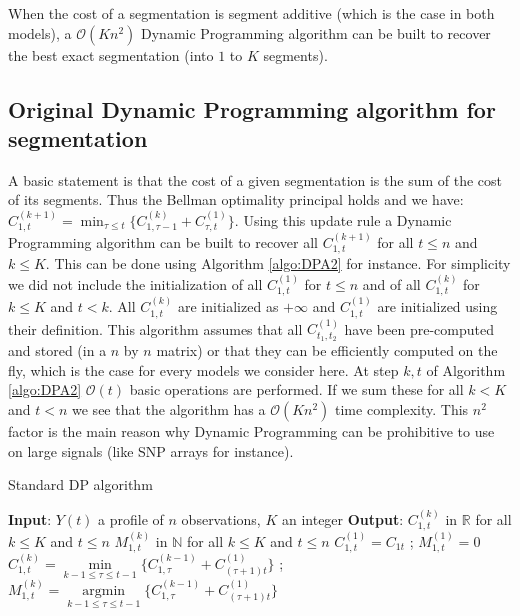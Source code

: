 \documentclass[11pt]{llncs}
\begin{document}
When the cost of a segmentation is segment additive (which is the case in both models), a $\mathcal{O}(Kn^2)$ Dynamic Programming algorithm can be built to recover the best exact segmentation (into $1$ to $K$ segments).

\subsection{Original Dynamic Programming algorithm for segmentation}

A basic statement is that the cost of a given segmentation is the sum of the cost of its segments. Thus the Bellman optimality principal holds and we have: $ C_{1, t}^{(k+1)} = \min_{\tau \leq t} \{ C_{1, \tau -1}^{(k)}  + C_{\tau, t}^{(1)} \} .$
Using this update rule  a Dynamic Programming algorithm can be built to recover all $ C_{1, t}^{(k+1)}$ for all $t \leq n$ and $k \leq K$.
This can be done using Algorithm \ref{algo:DPA2} for instance. 
For simplicity we did not include the initialization of all $C^{(1)}_{1,t}$ for $t \leq n$ and of all $C^{(k)}_{1,t}$ for $k \leq K$ and $t < k$.
All $C^{(k)}_{1,t}$ are initialized as $+\infty$ and $C^{(1)}_{1,t}$ are initialized using their definition.
This algorithm assumes that all $C_{t_1, t_2}^{(1)}$ have been pre-computed and stored (in 
a $n$ by $n$ matrix) or that they can be efficiently computed on the fly, which is the case for every models we consider here. At step $k, t$ of Algorithm \ref{algo:DPA2}  $\mathcal{O}(t)$ basic operations are performed. If we sum these for all $k < K$ and $t < n$  we see that the algorithm has a $\mathcal{O}(Kn^2)$ time complexity. This $n^2$ factor is the main reason why Dynamic Programming can be prohibitive to use on large signals (like SNP arrays for instance).

\begin{algorithm}
  \caption{Standard DP algorithm}\label{algo:DPA2}
  \begin{algorithmic}
    \State \textbf{Input}: $Y(t)$ a profile of $n$ observations, $K$ an integer
    \State \textbf{Output}: $C^{(k)}_{1,t}$ in $\mathbb{R}$ for all $k \leq K$ and $t \leq n$
    \State $M^{(k)}_{1,t}$ in $\mathbb{N}$ for all $k \leq K$ and $t \leq n$
         \State $C^{(1)}_{1,t} = C_{1t}$ ; $M^{(1)}_{1,t} = 0$  
    \EndFor
     	\State $C^{(k)}_{1,t} = \underset{k-1 \leq \tau \leq t-1}{\min} \{ C^{(k-1)}_{1,\tau}+ C_{(\tau+1)t}^{(1)} \}$ ; $M^{(k)}_{1,t} =\underset{k-1 \leq \tau \leq t-1}{\operatorname{argmin}} \{ C^{(k-1)}_{1,\tau}+ C_{(\tau+1)t}^{(1)} \}$ 
        \EndFor   
     \EndFor
  \end{algorithmic}
\end{algorithm}
\end{document}
